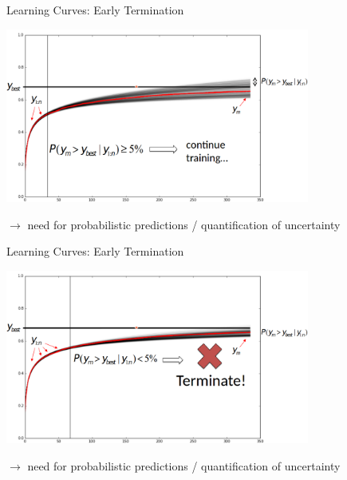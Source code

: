 \begin{frame}{Learning Curves: Early Termination}

\centering
\includegraphics[width=0.75\textwidth]{../w07_hpo_speedup/images/learningcurve/learning_curve_dec.png}

$\rightarrow$ need for \alert{probabilistic predictions / quantification of uncertainty}

\end{frame}
\begin{frame}{Learning Curves: Early Termination}

\centering
\includegraphics[width=0.75\textwidth]{../w07_hpo_speedup/images/learningcurve/learning_curve_dec2.png}

$\rightarrow$ need for \alert{probabilistic predictions / quantification of uncertainty}

\end{frame}

